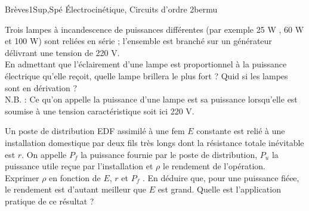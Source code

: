 
\begin{exercise}{Brèves}{1}{Sup,Spé}
{\'Electrocinétique, Circuits d'ordre 2}{bermu}

\begin{questions}
    \question Trois lampes à incandescence de puissances différentes (par exemple 25 W , 60 W et 100 W) sont reliées en
série ; l'ensemble est branché sur un générateur délivrant une tension de 220 V. \\
En admettant que
l'éclairement d'une lampe est proportionnel à la puissance électrique qu'elle reçoit, quelle lampe brillera le
plus fort ? Quid si les lampes sont en dérivation ? \\
N.B. : Ce qu'on appelle la puissance d'une lampe est sa puissance lorsqu'elle est soumise à une tension
caractéristique soit ici 220 V.

    \question Un poste de distribution EDF assimilé à une fem $E$ constante est relié à une installation domestique par deux
fils très longs dont la résistance totale inévitable est $r$. On appelle $P_f$ la puissance fournie par le poste de
distribution, $P_u$ la puissance utile reçue par l'installation et $\rho$ le rendement de l'opération. \\
Exprimer $\rho$ en fonction de $E$, $r$ et $P_f$ . En déduire que, pour une puissance fiéee, le rendement est d'autant
meilleur que $E$ est grand. Quelle est l'application pratique de ce résultat ?
\end{questions}
\end{exercise}